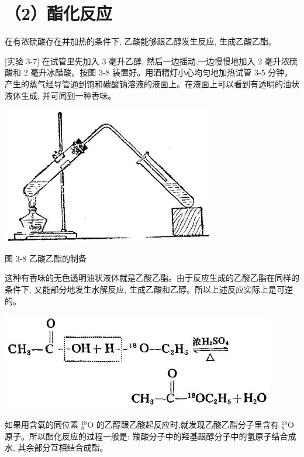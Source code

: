 \documentclass[10pt]{article}
\begin{document}
\section*{（2）酯化反应}

在有浓硫酸存在并加热的条件下, 乙酸能够跟乙醇发生反应, 生成乙酸乙酯。

[实验 3-7] 在试管里先加入 3 毫升乙醇, 然后一边摇动,一边慢慢地加入 2 毫升浓硫酸和 2 毫升冰醋酸。按图 3-8 装置好。用酒精灯小心均匀地加热试管 3-5 分钟。产生的蒸气经导管通到饱和碳酸钠溶液的液面上。在液面上可以看到有透明的油状液体生成, 并可闻到一种香味。

\begin{center}
\includegraphics[max width=0.7\textwidth]{images/01912d16-be99-77bb-9535-4f3ed8d9946f_133_875068.jpg}
\end{center}

图 3-8 乙酸乙酯的制备

这种有香味的无色透明油状液体就是乙酸乙酯。由于反应生成的乙酸乙酯在同样的条件下, 又能部分地发生水解反应, 生成乙酸和乙醇。所以上述反应实际上是可逆的。

\begin{center}
\includegraphics[max width=0.9\textwidth]{images/01912d16-be99-77bb-9535-4f3ed8d9946f_134_632076.jpg}
\end{center}

如果用含氧的同位素 \({}_{8}^{18}\mathrm{O}\) 的乙醇跟乙酸起反应时,就发现乙酸乙酯分子里含有 \({}_{8}^{18}\mathrm{O}\) 原子。所以酯化反应的过程一般是: 羧酸分子中的羟基跟醇分子中的氢原子结合成水, 其余部分互相结合成酯。
\end{document}
